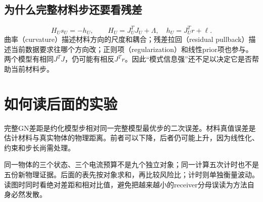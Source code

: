 \subsection{为什么完整材料步还要看残差}
\[
H_Us_U=-h_U,\qquad H_U=J_U^TJ_U+\Lambda,\quad h_U=J_U^Tr+\ell.
\]
曲率（curvature）描述材料方向的尺度和耦合；残差拉回（residual pullback）描述当前数据要求往哪个方向改；正则项（regularization）和线性prior项也参与。两个模型有相同$J^TJ$，仍可能有相反$J^Tr$。因此“模式信息强”还不足以决定它是否帮助当前材料步。

\section{如何读后面的实验}
完整GN差距是约化模型步相对同一完整模型最优步的二次误差。材料真值误差是估计材料与真实物体的物理距离。前者可以下降，后者仍可能上升，因为线性化、约束和步长尚需处理。

同一物体的三个状态、三个电流预算不是九个独立对象；同一计算五次计时也不是五份新物理证据。后面的表先按对象求和，再比较风险比；计时则单独衡量波动。读图时同时看绝对差距和相对比值，避免把越来越小的receiver分母误读为方法自身必然发散。
